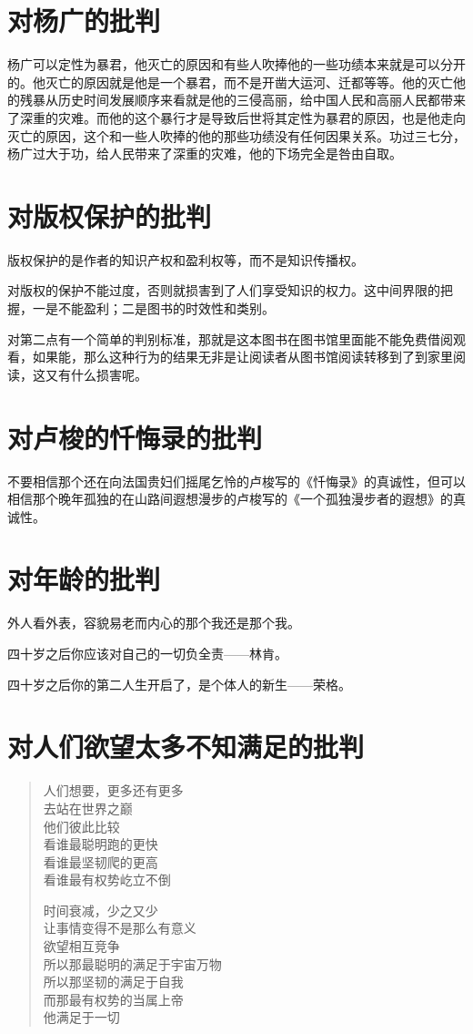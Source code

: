 \documentclass[12pt,oneside]{book}
\newenvironment{shici}{
\begin{verse}
\centering\large\hspace{12pt}}
{\end{verse}}
\begin{document}
\chapter{对杨广的批判}
杨广可以定性为暴君，他灭亡的原因和有些人吹捧他的一些功绩本来就是可以分开的。他灭亡的原因就是他是一个暴君，而不是开凿大运河、迁都等等。他的灭亡他的残暴从历史时间发展顺序来看就是他的三侵高丽，给中国人民和高丽人民都带来了深重的灾难。而他的这个暴行才是导致后世将其定性为暴君的原因，也是他走向灭亡的原因，这个和一些人吹捧的他的那些功绩没有任何因果关系。功过三七分，杨广过大于功，给人民带来了深重的灾难，他的下场完全是咎由自取。

\chapter{对版权保护的批判}
版权保护的是作者的知识产权和盈利权等，而不是知识传播权。

对版权的保护不能过度，否则就损害到了人们享受知识的权力。这中间界限的把握，一是不能盈利；二是图书的时效性和类别。

对第二点有一个简单的判别标准，那就是这本图书在图书馆里面能不能免费借阅观看，如果能，那么这种行为的结果无非是让阅读者从图书馆阅读转移到了到家里阅读，这又有什么损害呢。




\chapter{对卢梭的忏悔录的批判}
不要相信那个还在向法国贵妇们摇尾乞怜的卢梭写的《忏悔录》的真诚性，但可以相信那个晚年孤独的在山路间遐想漫步的卢梭写的《一个孤独漫步者的遐想》的真诚性。

\chapter{对年龄的批判}
外人看外表，容貌易老而内心的那个我还是那个我。

四十岁之后你应该对自己的一切负全责——林肯。

四十岁之后你的第二人生开启了，是个体人的新生——荣格。


\chapter{对人们欲望太多不知满足的批判}
\begin{shici}
人们想要，更多还有更多\\
去站在世界之巅\\
他们彼此比较\\
看谁最聪明跑的更快\\
看谁最坚韧爬的更高\\
看谁最有权势屹立不倒

时间衰减，少之又少\\
让事情变得不是那么有意义\\
欲望相互竞争\\
所以那最聪明的满足于宇宙万物\\
所以那坚韧的满足于自我\\
而那最有权势的当属上帝\\
他满足于一切
\end{shici}
\end{document}
